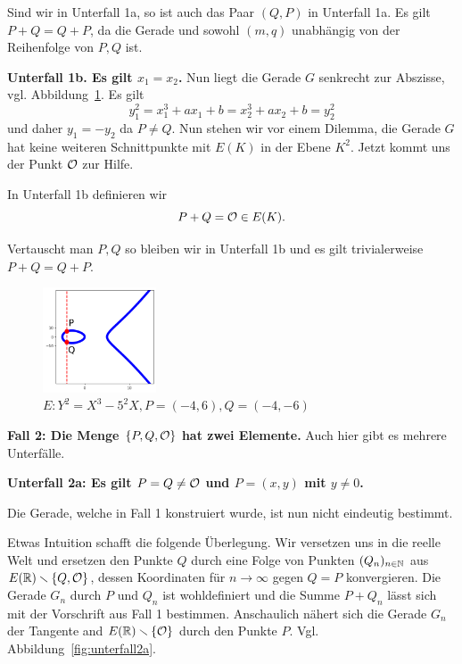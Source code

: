 Sind wir in  Unterfall 1a, so ist auch das Paar $(Q,P)$ in Unterfall
1a. Es gilt $P+Q=Q+P$, da die Gerade und sowohl $(m,q)$ unabhängig von
der Reihenfolge von $P,Q$ ist. 

\textbf{Unterfall 1b. Es gilt $x_1=x_2$.} Nun liegt die Gerade $G$
senkrecht zur Abszisse, vgl. Abbildung~\ref{fig:unterfall1b}. Es gilt
\begin{equation*}
  y_1^2 = x_1^3+a x_1 +b = x_2^3+a x_2 +b = y_2^2
\end{equation*}
und daher $y_1=-y_2$ da $P\not=Q$. Nun stehen wir vor einem
Dilemma, die Gerade $G$ hat keine weiteren Schnittpunkte mit $E(K)$ in
der Ebene $K^2$. Jetzt kommt uns der Punkt ${\mathcal O}$ zur Hilfe.

In Unterfall 1b definieren wir
\begin{equation*}
  P+Q = {\mathcal O} \in E(K).
\end{equation*}

Vertauscht man $P,Q$ so bleiben wir in Unterfall 1b und es gilt
trivialerweise $P+Q=Q+P$.  

\begin{figure}
  \centering    
  \caption{$E: Y^2 = X^3-5^2 X,P = (-4,6),Q = (-4,-6)$}
  \label{fig:unterfall1b}
  \includegraphics[width=0.3\textwidth]{./plots/unterfall1b.png}
\end{figure}

\medskip
\textbf{Fall 2: Die Menge $\{P,Q,{\mathcal O}\}$ hat zwei Elemente.} Auch hier
gibt es mehrere Unterfälle.

\textbf{Unterfall 2a: Es gilt $P=Q\not={\mathcal O}$ und $P=(x,y)$ mit $y\not=0$.}

Die Gerade, welche in Fall 1 konstruiert wurde, ist nun nicht
eindeutig bestimmt.

Etwas Intuition schafft die folgende Überlegung. Wir
versetzen uns in die reelle Welt und ersetzen den Punkte $Q$ durch
eine Folge von Punkten $(Q_n)_{n\in{\mathbb{N}}}$ aus $E({\mathbb{R}})\smallsetminus\{Q,{\mathcal O}\}$, dessen
Koordinaten für $n\rightarrow\infty$ gegen $Q=P$ konvergieren.
Die Gerade $G_n$ durch $P$ und $Q_n$ ist wohldefiniert und die Summe
$P+Q_n$ lässt sich mit der Vorschrift aus Fall 1 bestimmen.
Anschaulich nähert sich die Gerade $G_n$ der Tangente and
$E({\mathbb{R}})\smallsetminus\{{\mathcal O}\}$ durch den Punkte $P$. Vgl.
Abbildung~\ref{fig:unterfall2a}. 

